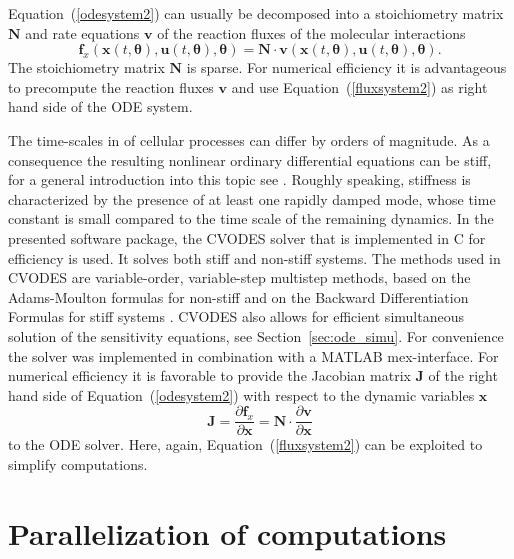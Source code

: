 \documentclass[12pt,a4paper]{scrartcl}
\newcommand{\dd}[2]{\frac{\partial #1}{\partial #2}}
\begin{document}
Equation~(\ref{odesystem2}) can usually be decomposed into a stoichiometry matrix $
\mathbf{N}$ and rate equations $\mathbf{v}$ of the reaction fluxes of the molecular 
interactions
\begin{equation}
	\mathbf{f}_{x}(\mathbf{x}(t, \boldsymbol{\theta}), \mathbf{u}(t, \boldsymbol{\theta}), 
\boldsymbol{\theta}) = \mathbf{N} \cdot \mathbf{v}(\mathbf{x}(t, \boldsymbol{\theta}), 
\mathbf{u}(t, \boldsymbol{\theta}), \boldsymbol{\theta}). \label{fluxsystem2}
\end{equation}
The stoichiometry matrix $\mathbf{N}$ is sparse. For numerical efficiency it is 
advantageous to precompute the reaction fluxes $\mathbf{v}$ and use 
Equation~(\ref{fluxsystem2}) as right hand side of the ODE system. 

The time-scales in of cellular processes can differ by orders of magnitude. As a 
consequence the resulting nonlinear ordinary differential equations can be stiff, for a 
general introduction into this topic see \citet{Lambert:1977fk}. Roughly speaking, stiffness 
is characterized by the presence of at least one rapidly damped mode, whose time 
constant is small compared to the time scale of the remaining dynamics. In the presented 
software package, the CVODES solver \citep{Hindmarsh:2005fb} that is implemented in C for 
efficiency is used. It solves both stiff and non-stiff systems. The methods used in CVODES 
are variable-order, variable-step multistep methods, based on the Adams-Moulton 
formulas for non-stiff and on the Backward Differentiation Formulas for stiff systems 
\citep{Byrne:1975uq}. CVODES also allows for efficient simultaneous solution of the 
sensitivity equations, see Section~\ref{sec:ode_simu}. For convenience the solver was 
implemented in combination with a MATLAB mex-interface. For numerical efficiency it is 
favorable to provide the Jacobian matrix $\mathbf{J}$ of the right hand side of 
Equation~(\ref{odesystem2}) with respect to the dynamic variables $\mathbf{x}$ 
\begin{equation}
	\mathbf{J} = \dd{\mathbf{f}_{x}}{\mathbf{x}} = \mathbf{N} \cdot \dd{\mathbf{v}}
{\mathbf{x}}\label{jac_mat}
\end{equation}
to the ODE solver. Here, again, Equation~(\ref{fluxsystem2}) can be exploited to simplify 
computations.

\section{Parallelization of computations} \label{sec:parallel}
\end{document}
